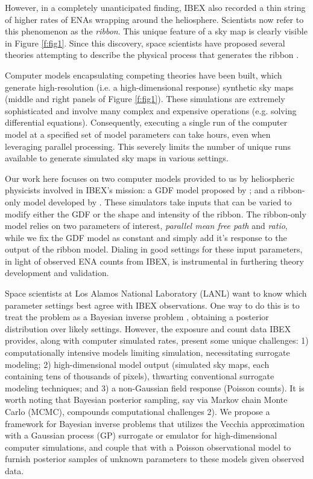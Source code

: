 \documentclass[11pt]{article}
\begin{document}
However, in a completely unanticipated finding, IBEX also recorded a thin
string of higher rates of ENAs \citep{fuselier2009IBEXribbon} wrapping around
the heliosphere. Scientists now refer to this phenomenon as the
\textit{ribbon}. This unique feature of a sky map is clearly visible in Figure
\ref{f:fig1}. Since this discovery, space scientists have proposed several
theories attempting to describe the physical process that generates the ribbon
\citep{mccomas2014ibex, zirnstein2018role, zirnstein2019strong,
zirnstein2021dependence}.

Computer models encapsulating competing theories have been built, which generate
high-resolution (i.e. a high-dimensional response) synthetic sky maps (middle
and right panels of Figure \ref{f:fig1}). These simulations are extremely
sophisticated and involve many complex and expensive operations (e.g. solving
differential equations). Consequently, executing a single run of the computer
model at a specified set of model parameters can take hours, even when
leveraging parallel processing. This severely limits the number of unique runs
available to generate simulated sky maps in various settings.

Our work here focuses on two computer models provided to us by heliospheric
physicists involved in IBEX's mission: a GDF model proposed by
\citet{zirnstein2021heliosheath,zirnstein2025global,swaczyna2020density}; and a
ribbon-only model developed by \citet{huang2025numerical}. These simulators
take inputs that can be varied to modify either the GDF or the shape and
intensity of the ribbon. The ribbon-only model relies on two parameters of
interest, \textit{parallel mean free path} and \textit{ratio}, while we fix the
GDF model as constant and simply add it's response to the output of the ribbon
model. Dialing in good settings for these input parameters, in light of
observed ENA counts from IBEX, is instrumental in furthering theory development
and validation.

Space scientists at Los Alamos National Laboratory (LANL) want to know which
parameter settings best agree with IBEX observations. One way to do this is to
treat the problem as a Bayesian inverse problem
\citep{kaipio2011bayesian,stuart2010inverse,knapik2011bayesian}, obtaining a
posterior distribution over likely settings.  However, the exposure and count
data IBEX provides, along with computer simulated rates, present some unique
challenges: 1) computationally intensive models limiting simulation,
necessitating surrogate modeling; 2) high-dimensional model output (simulated
sky maps, each containing tens of thousands of pixels), thwarting conventional
surrogate modeling techniques; and 3) a non-Gaussian field response (Poisson
counts). It is worth noting that Bayesian posterior sampling, say via Markov
chain Monte Carlo (MCMC), compounds {\color{red} computational challenges} 2).
We propose a framework for Bayesian inverse problems that utilizes the Vecchia
approximation \citep{katzfuss2021general,scaledvecchiakatzfuss2022} with a
Gaussian process (GP) surrogate or emulator for high-dimensional computer
simulations, and couple that with a Poisson observational model to furnish
posterior samples of unknown parameters to these models given observed data.
\end{document}
